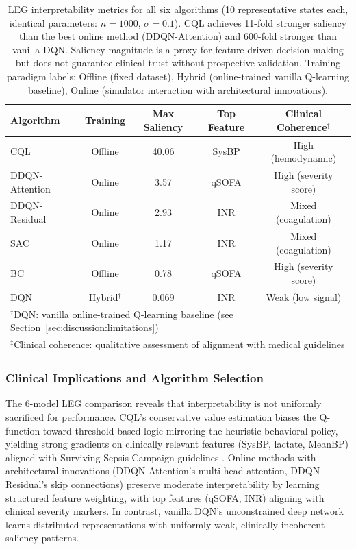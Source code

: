 \begin{table}[htbp]
\centering
\caption{LEG interpretability metrics for all six algorithms (10 representative states each, identical parameters: $n=1000$, $\sigma=0.1$). CQL achieves 11-fold stronger saliency than the best online method (DDQN-Attention) and 600-fold stronger than vanilla DQN. Saliency magnitude is a proxy for feature-driven decision-making but does not guarantee clinical trust without prospective validation. Training paradigm labels: Offline (fixed dataset), Hybrid (online-trained vanilla Q-learning baseline), Online (simulator interaction with architectural innovations).}
\label{tab:interpretability-metrics}
\begin{tabular}{lcccc}
\toprule
\textbf{Algorithm} & \textbf{Training} & \textbf{Max Saliency} & \textbf{Top Feature} & \textbf{Clinical Coherence$^\ddagger$} \\
\midrule
CQL                & Offline  & 40.06  & SysBP    & High (hemodynamic) \\
DDQN-Attention     & Online   & 3.57   & qSOFA    & High (severity score) \\
DDQN-Residual      & Online   & 2.93   & INR      & Mixed (coagulation) \\
SAC                & Online   & 1.17   & INR      & Mixed (coagulation) \\
BC                 & Offline  & 0.78   & qSOFA    & High (severity score) \\
DQN                & Hybrid$^\dagger$  & 0.069  & INR      & Weak (low signal) \\
\bottomrule
\multicolumn{5}{l}{\scriptsize $^\dagger$DQN: vanilla online-trained Q-learning baseline (see Section~\ref{sec:discussion:limitations})} \\
\multicolumn{5}{l}{\scriptsize $^\ddagger$Clinical coherence: qualitative assessment of alignment with medical guidelines} \\
\end{tabular}
\end{table}


\subsubsection{Clinical Implications and Algorithm Selection}

The 6-model LEG comparison reveals that interpretability is not uniformly sacrificed for performance. CQL's conservative value estimation biases the Q-function toward threshold-based logic mirroring the heuristic behavioral policy, yielding strong gradients on clinically relevant features (SysBP, lactate, MeanBP) aligned with Surviving Sepsis Campaign guidelines \citep{rhodes2017ssc}. Online methods with architectural innovations (DDQN-Attention's multi-head attention, DDQN-Residual's skip connections) preserve moderate interpretability by learning structured feature weighting, with top features (qSOFA, INR) aligning with clinical severity markers. In contrast, vanilla DQN's unconstrained deep network learns distributed representations with uniformly weak, clinically incoherent saliency patterns.

